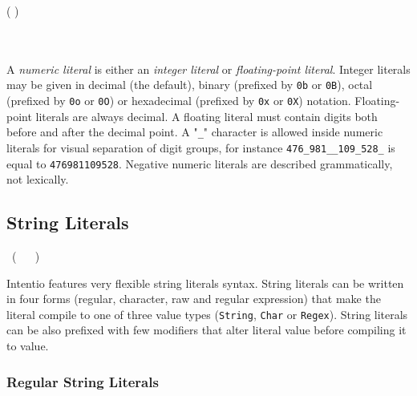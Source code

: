 \begin{bnf}
   \eq (  \gor {} ) \ \gtry{ \term{+} \gor \term{-} } \ \gmany{\term{\_}} \  \\
  \\
   \eq    {} \  \  \ 
             \gorln {} \ 
\end{bnf}

A \emph{numeric literal} is either an \emph{integer literal} or \emph{floating-point literal}. Integer literals may be given in decimal (the default), binary (prefixed by \texttt{0b} or \texttt{0B}), octal (prefixed by \texttt{0o} or \texttt{0O}) or hexadecimal (prefixed by \texttt{0x} or \texttt{0X}) notation. Floating-point literals are always decimal. A floating literal must contain digits both before and after the decimal point. A "\texttt{\_}" character is allowed inside numeric literals for visual separation of digit groups, for instance \lstinline{476_981__109_528_} is equal to \lstinline{476981109528}. Negative numeric literals are described grammatically, not lexically.

\subsection{String Literals}

\begin{bnf}
   \eq {} \ ( \  \gor {} \gor {} \gor {} \ )
\end{bnf}

Intentio features very flexible string literals syntax. String literals can be written in four forms (regular, character, raw and regular expression) that make the literal compile to one of three value types (\lstinline{String}, \lstinline{Char} or \lstinline{Regex}). String literals can be also prefixed with few modifiers that alter literal value before compiling it to value.

\subsubsection*{Regular String Literals}

\begin{bnf}
   \eq {} \  \ 
\end{bnf}

